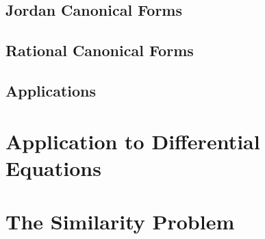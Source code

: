 \documentclass[11pt]{report}
\begin{document}
\section{Jordan Canonical Forms}
\section{Rational Canonical Forms}
\section{Applications}


\chapter{Application to Differential Equations}


\chapter{The Similarity Problem}
\end{document}
